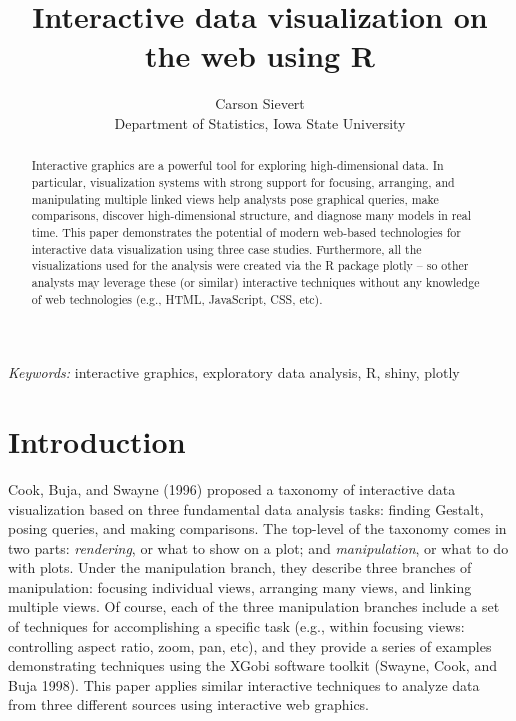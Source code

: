 \documentclass[12pt,]{article}
\theoremstyle{definition}
\theoremstyle{definition}
\theoremstyle{remark}
\begin{document}
\def\spacingset#1{\renewcommand{\baselinestretch}%
{#1}\small\normalsize} \spacingset{1}

\title{\bf Interactive data visualization on the web using R}
\author{Carson Sievert \\ Department of Statistics, Iowa State University}
\maketitle

\bigskip
\begin{abstract}
Interactive graphics are a powerful tool for exploring high-dimensional
data. In particular, visualization systems with strong support for
focusing, arranging, and manipulating multiple linked views help
analysts pose graphical queries, make comparisons, discover
high-dimensional structure, and diagnose many models in real time. This
paper demonstrates the potential of modern web-based technologies for
interactive data visualization using three case studies. Furthermore,
all the visualizations used for the analysis were created via the R
package plotly -- so other analysts may leverage these (or similar)
interactive techniques without any knowledge of web technologies (e.g.,
HTML, JavaScript, CSS, etc).
\end{abstract}

\noindent
{\it Keywords:}  interactive graphics, exploratory data analysis, R, shiny, plotly
\vfill

\newpage
\spacingset{1.45} %


\section{Introduction}\label{introduction}

Cook, Buja, and Swayne (1996) proposed a taxonomy of interactive data
visualization based on three fundamental data analysis tasks: finding
Gestalt, posing queries, and making comparisons. The top-level of the
taxonomy comes in two parts: \emph{rendering}, or what to show on a
plot; and \emph{manipulation}, or what to do with plots. Under the
manipulation branch, they describe three branches of manipulation:
focusing individual views, arranging many views, and linking multiple
views. Of course, each of the three manipulation branches include a set
of techniques for accomplishing a specific task (e.g., within focusing
views: controlling aspect ratio, zoom, pan, etc), and they provide a
series of examples demonstrating techniques using the XGobi software
toolkit (Swayne, Cook, and Buja 1998). This paper applies similar
interactive techniques to analyze data from three different sources
using interactive web graphics.
\end{document}
